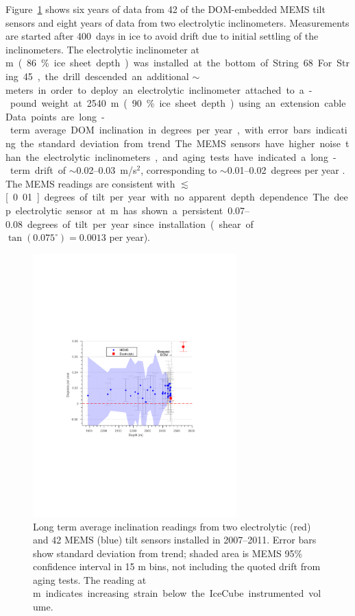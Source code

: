 Figure~\ref{fig:tilt} shows
six years of data from 42 of the DOM-embedded MEMS tilt sensors and
eight years of data from two electrolytic inclinometers. Measurements are
started after 400~days in ice to avoid  
drift due to initial settling of the inclinometers. The electrolytic
inclinometer at \unit[2455]m (86\% ice sheet depth) was 
installed at the bottom of String 68.  For String 45, the drill
descended an additional $\sim$\unit[100]meters in order to deploy an
electrolytic inclinometer attached to a \unit[100]-pound weight at 2540 m
(90\% ice sheet depth) using an extension cable. Data
points are long-term average DOM inclination in degrees per year, with error
bars indicating the standard deviation from trend.  The MEMS sensors have
higher noise than the electrolytic inclinometers, and aging tests have indicated a long-term
drift of $\sim$\numrange[range-phrase = --]{0.02}{0.03}~m/s$^2$, corresponding to
$\sim$\numrange[range-phrase = --]{0.01}{0.02}~degrees per year
\cite{inclinometer_comm}. The MEMS readings are consistent with
$\lesssim$\unit[0.01]degrees of tilt per year with no apparent depth
dependence.  The deep electrolytic sensor 
at \unit[2540]m has shown a persistent \numrange[range-phrase =
  --]{0.07}{0.08} degrees of tilt per year since installation (shear
  of $\tan(0.075^\circ) = 0.0013$
per year).

\begin{figure}[!ht]
	\centering
    \includegraphics[width=0.7\textwidth]{graphics/geometry/tilt5.pdf}
	\caption{Long term average inclination readings from two electrolytic
      (red) and 42 MEMS (blue) tilt sensors installed in 2007--2011.  Error
      bars show standard deviation from trend; shaded area is MEMS 95\%
      confidence interval in 15 m bins, not including the quoted drift
      from aging tests.  The reading at \unit[2540]m
      indicates increasing strain below the IceCube instrumented volume.}
	\label{fig:tilt}
\end{figure}

